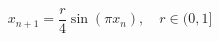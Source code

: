 \documentclass[preview,border=4pt]{standalone}
\begin{document}
\begin{equation}
x_{n+1} = \frac{r}{4}\sin(\pi x_n), \quad r \in (0, 1]
\end{equation}
\end{document}
